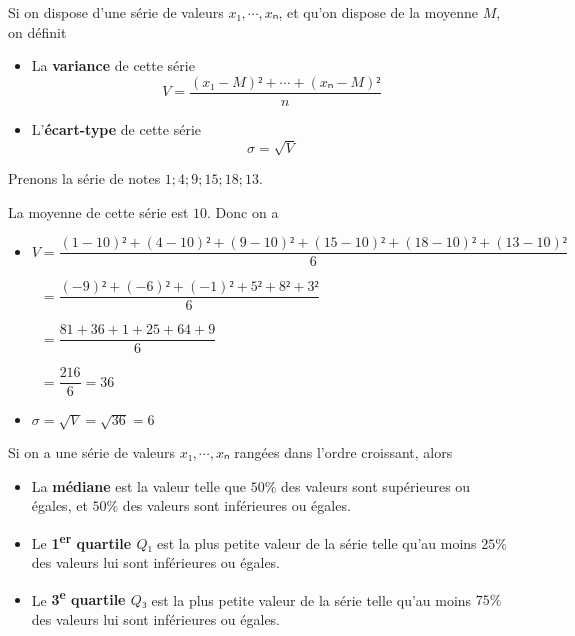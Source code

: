 \documentclass[
	classe=$2^{de}$
]{coursclass}
\begin{document}
\begin{definition}
	Si on dispose d'une série de valeurs $x₁, ⋯, xₙ$, et qu'on dispose de la moyenne $M$, on définit
	\begin{itemize}
		\item La \textbf{variance} de cette série
		      $$ V = \dfrac{(x₁ - M)² + ⋯ + (xₙ - M)²}{n} $$
		\item L'\textbf{écart-type} de cette série
		      $$ σ = \sqrt{V} $$
	\end{itemize}
\end{definition}

\begin{exemple}
	Prenons la série de notes $1 ; 4 ; 9 ; 15 ; 18 ; 13$.

	La moyenne de cette série est $10$. Donc on a
	\begin{itemize}
		\item $V = \dfrac{(1 - 10)² + (4 - 10)² + (9 - 10)² + (15 - 10)² + (18 - 10)² + (13 - 10)²}{6}$ \vspace{0.5em}

		      $\phantom{V} = \dfrac{(-9)² + (-6)² + (-1)² + 5² + 8² + 3²}{6}$ \vspace{0.5em}

		      $\phantom{V} = \dfrac{81 + 36 + 1 + 25 + 64 + 9}{6}$ \vspace{0.5em}

		      $\phantom{V} = \dfrac{216}{6} = 36$
		\item $σ = \sqrt{V} = \sqrt{36} = 6$
	\end{itemize}
\end{exemple}

\begin{definition}
	Si on a une série de valeurs $x₁,⋯,xₙ$ rangées dans l'ordre croissant, alors
	\begin{itemize}
		\item La \textbf{médiane} est la valeur telle que $50\%$ des valeurs sont supérieures ou égales, et $50\%$ des valeurs sont inférieures ou égales.
		\item Le \textbf{1\textsuperscript{er} quartile $Q₁$} est la plus petite valeur de la série telle qu'au moins $25\%$ des valeurs lui sont inférieures ou égales.
		\item Le \textbf{3\textsuperscript{e} quartile $Q₃$} est la plus petite valeur de la série telle qu'au moins $75\%$ des valeurs lui sont inférieures ou égales.
	\end{itemize}
\end{definition}
\end{document}
